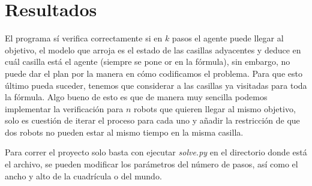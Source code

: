 \documentclass{article}
\begin{document}
	\section*{Resultados} 
		El programa sí verifica correctamente si en $k$ pasos el agente puede llegar al objetivo, el modelo que arroja 
		es el estado de las casillas adyacentes y deduce en cuál casilla está el agente (siempre se pone or en la fórmula), 
		sin embargo, no puede dar el plan por la manera en cómo codificamos el problema. Para que esto último pueda suceder, 
		tenemos que considerar a las casillas ya visitadas para toda la fórmula. 
		Algo bueno de esto es que de manera muy sencilla podemos implementar la verificación para $n$ robots que quieren 
		llegar al mismo objetivo, solo es cuestión de iterar el proceso para cada uno y añadir la restricción de 
		que dos robots no pueden estar al mismo tiempo en la misma casilla. 
		
		Para correr el proyecto solo basta con ejecutar \textit{solve.py} en el directorio donde está el archivo, se pueden modificar los parámetros del número de pasos, así como el ancho y alto de la cuadrícula o del mundo. 
    
\end{document}
